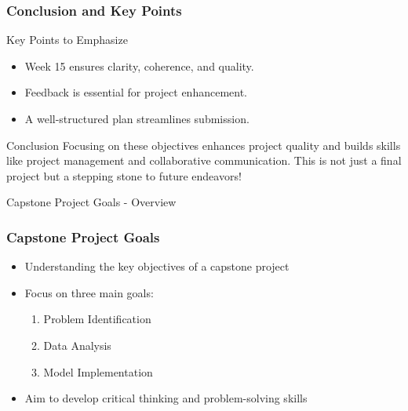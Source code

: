 \documentclass[aspectratio=169]{beamer}
\begin{document}
\begin{frame}[fragile]
    \frametitle{Conclusion and Key Points}
    \begin{block}{Key Points to Emphasize}
        \begin{itemize}
            \item Week 15 ensures clarity, coherence, and quality.
            \item Feedback is essential for project enhancement.
            \item A well-structured plan streamlines submission.
        \end{itemize}
    \end{block}
    \begin{block}{Conclusion}
        Focusing on these objectives enhances project quality and builds skills like project management and collaborative communication. 
        This is not just a final project but a stepping stone to future endeavors!
    \end{block}
\end{frame}

\begin{frame}[fragile]{Capstone Project Goals - Overview}
    \frametitle{Capstone Project Goals}
    \begin{itemize}
        \item Understanding the key objectives of a capstone project
        \item Focus on three main goals:
            \begin{enumerate}
                \item Problem Identification
                \item Data Analysis
                \item Model Implementation
            \end{enumerate}
        \item Aim to develop critical thinking and problem-solving skills
    \end{itemize}
\end{frame}
\end{document}
